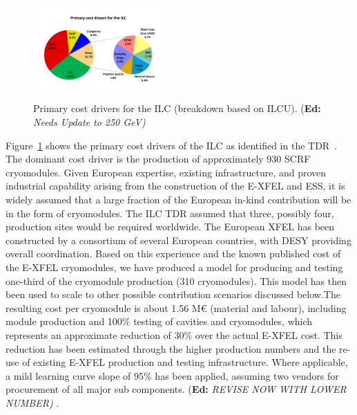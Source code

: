 \documentclass[%
 reprint,
 amsmath,amssymb,
 aps,
]{revtex4-1}
\newif\ifEdNotes \EdNotestrue
\newcommand{\doednote}[1]{{\color{red}(\textbf{Ed:} \textit{#1)}}}
\newcommand{\ednote}[1]{\ifEdNotes 
  \doednote{#1} 
\fi}
\begin{document}
\begin{figure}[htbp]
\begin{center}
\includegraphics[width=0.45\textwidth]{figures/eap-chp3-ilccostdrivers.pdf}
 \caption{\label{fig:constructionmodel:ILCPrimaryCostDrivers} Primary cost drivers for the ILC (breakdown based on ILCU). \ednote{Needs Update to 250 GeV}}
\end{center}
\end{figure}

Figure~\ref{fig:constructionmodel:ILCPrimaryCostDrivers} shows the primary cost drivers of the ILC as identified in the TDR~\cite{Adolphsen:2013kya}. The dominant cost driver is the production of approximately 930 SCRF cryomodules. Given European expertise, 
existing infrastructure, and proven industrial capability arising from the construction 
of the E-XFEL and ESS, it is widely assumed that a large fraction of the European in-kind contribution 
will be in the form of cryomodules. The ILC TDR assumed that three, possibly four, production sites 
would be required worldwide. 
The European XFEL has been constructed by a consortium of several European countries, with DESY providing overall coordination. Based on this experience and the known published cost of the E-XFEL cryomodules, we have produced a model for producing and testing one-third of the cryomodule production (310 cryomodules). This model has then been used to scale to other possible contribution scenarios discussed below.The resulting cost per cryomodule is about 1.56 M\euro{} (material and labour), including module production and 100\% testing of cavities and cryomodules, which represents an approximate reduction of 30\% over the actual E-XFEL cost. This reduction has been estimated through the higher production numbers and the re-use of existing E-XFEL production and testing infrastructure.  Where applicable, a mild learning curve slope of 95\% has been applied, assuming two vendors for procurement of all major sub components. \ednote{REVISE NOW WITH LOWER NUMBER}.
\end{document}
